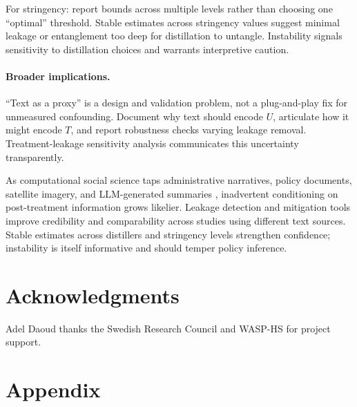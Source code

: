 \documentclass[11pt]{article}
\begin{document}
For stringency: report bounds across multiple levels rather than choosing one ``optimal'' threshold. Stable estimates across stringency values suggest minimal leakage or entanglement too deep for distillation to untangle. Instability signals sensitivity to distillation choices and warrants interpretive caution.

\paragraph{Broader implications.} ``Text as a proxy'' is a design and validation problem, not a plug-and-play fix for unmeasured confounding. Document why text should encode $U$, articulate how it might encode $T$, and report robustness checks varying leakage removal. Treatment-leakage sensitivity analysis communicates this uncertainty transparently.

As computational social science taps administrative narratives, policy documents, satellite imagery, and LLM-generated summaries \citep{sakamotoEarthObs2024,daoudSatelliteML2024,daoudSatelliteIndia2023,petterssonSatelliteGNN2025}, inadvertent conditioning on post-treatment information grows likelier. Leakage detection and mitigation tools improve credibility and comparability across studies using different text sources. Stable estimates across distillers and stringency levels strengthen confidence; instability is itself informative and should temper policy inference.

\section*{Acknowledgments}
Adel Daoud thanks the Swedish Research Council and WASP-HS for project support.





\section{Appendix}
\end{document}
